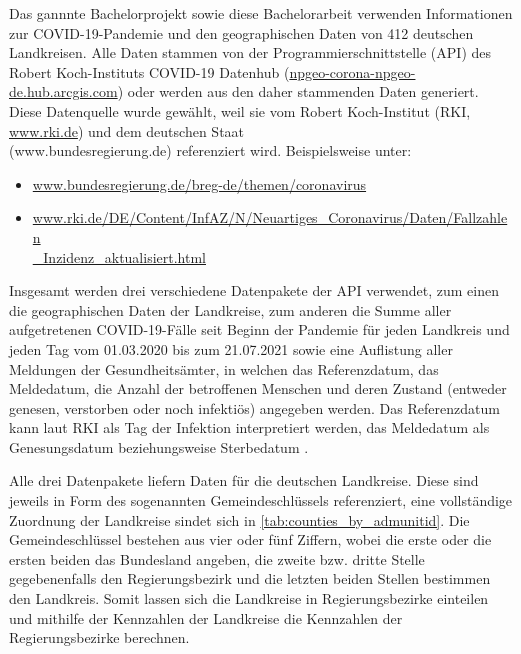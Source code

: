 Das gannnte Bachelorprojekt sowie diese Bachelorarbeit verwenden Informationen zur COVID-19-Pandemie und den geographischen Daten von 412 deutschen Landkreisen. Alle Daten stammen von der Programmierschnittstelle (API) des Robert Koch-Instituts \glqq{}COVID-19 Datenhub\grqq{}
(\href{npgeo-corona-npgeo-de.hub.arcgis.com}{npgeo-corona-npgeo-de.hub.arcgis.com}) oder werden aus den daher stammenden Daten generiert. Diese Datenquelle wurde gewählt, weil sie vom Robert Koch-Institut (RKI, \href{www.rki.de}{www.rki.de}) und dem deutschen Staat\\
 (www.bundesregierung.de) referenziert wird. Beispielsweise unter:
\begin{itemize}
    \item \href{www.bundesregierung.de/breg-de/themen/coronavirus}{www.bundesregierung.de/breg-de/themen/coronavirus}
    \item \href{www.rki.de/DE/Content/InfAZ/N/Neuartiges_Coronavirus/Daten/Fallzahlen_Inzidenz_aktualisiert.html}{www.rki.de/DE/Content/InfAZ/N/Neuartiges\_Coronavirus/Daten/Fallzahlen}\\
    \href{www.rki.de/DE/Content/InfAZ/N/Neuartiges_Coronavirus/Daten/Fallzahlen_Inzidenz_aktualisiert.html}{\_Inzidenz\_aktualisiert.html}
\end{itemize}

Insgesamt werden drei verschiedene Datenpakete der API verwendet, zum einen die geographischen Daten der Landkreise, zum anderen die Summe aller aufgetretenen COVID-19-Fälle seit Beginn der Pandemie für jeden Landkreis und jeden Tag vom 01.03.2020 bis zum 21.07.2021 sowie eine Auflistung aller Meldungen der Gesundheitsämter, in welchen das  Referenzdatum, das Meldedatum, die Anzahl der betroffenen Menschen und deren Zustand (entweder genesen, verstorben oder noch infektiös) angegeben werden. Das Referenzdatum kann laut RKI als Tag der Infektion interpretiert werden, das Meldedatum als Genesungsdatum beziehungsweise Sterbedatum \autocite{RKI_Bulletin}.

Alle drei Datenpakete liefern Daten für die deutschen Landkreise. Diese sind jeweils in Form des sogenannten Gemeindeschlüssels referenziert, eine vollständige Zuordnung der Landkreise sindet sich in \autoref{tab:counties_by_admunitid}. Die Gemeindeschlüssel bestehen aus vier oder fünf Ziffern, wobei die erste oder die ersten beiden das Bundesland angeben, die zweite bzw. dritte Stelle gegebenenfalls den Regierungsbezirk und die letzten beiden Stellen bestimmen den Landkreis. Somit lassen sich die Landkreise in Regierungsbezirke einteilen und mithilfe der Kennzahlen der Landkreise die Kennzahlen der Regierungsbezirke berechnen.

